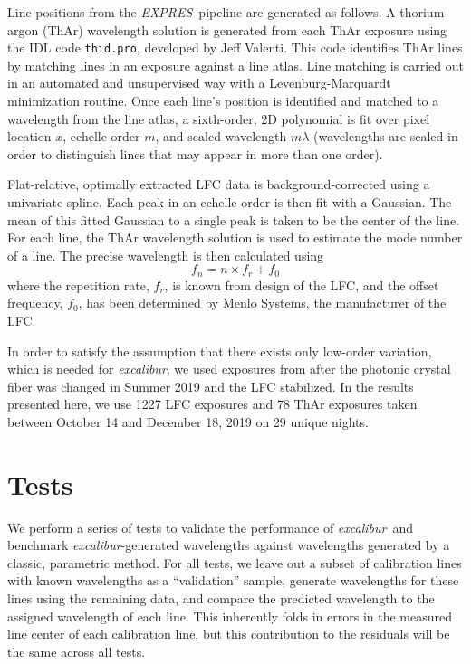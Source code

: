 \documentclass[modern]{aastex63}
\newcommand{\project}[1]{\textsl{#1}}
\newcommand{\name}{\project{excalibur}}
\newcommand{\acronym}[1]{{\small{#1}}}
\newcommand{\expres}{\project{\acronym{EXPRES}}}
\begin{document}
Line positions from the \expres\ pipeline are generated as follows.  A thorium argon (ThAr) wavelength solution is generated from each ThAr exposure using the IDL code \texttt{thid.pro}, developed by Jeff Valenti.  This code identifies ThAr lines by matching lines in an exposure against a line atlas.  Line matching is carried out in an automated and unsupervised way with a Levenburg-Marquardt minimization routine.  Once each line's position is identified and matched to a wavelength from the line atlas, a sixth-order, 2D polynomial is fit over pixel location $x$, echelle order $m$, and scaled wavelength $m\lambda$ (wavelengths are scaled in order to distinguish lines that may appear in more than one order).
 
 Flat-relative, optimally extracted LFC data is background-corrected using a univariate spline.  Each peak in an echelle order is then fit with a Gaussian.  The mean of this fitted Gaussian to a single peak is taken to be the center of the line.  For each line, the ThAr wavelength solution is used to estimate the mode number of a line.  The precise wavelength is then calculated using
 \begin{equation}
 f_n = n \times  f_r + f_0
 \label{eq:lfc}
 \end{equation}
 where the repetition rate, $f_r$, is known from design of the LFC, and the offset frequency, $f_0$, has been determined by Menlo Systems, the manufacturer of the LFC.
 
In order to satisfy the assumption that there exists only low-order variation, which is needed for \name, we used exposures from after the photonic crystal fiber was changed in Summer 2019 and the LFC stabilized.  In the results presented here, we use 1227 LFC exposures and 78 ThAr exposures taken between October 14 and December 18, 2019 on 29 unique nights.


\section{Tests}\label{sec:tests}
We perform a series of tests to validate the performance of \name\ and benchmark \name -generated wavelengths against wavelengths generated by a classic, parametric method.  For all tests, we leave out a subset of calibration lines with known wavelengths as a ``validation'' sample, generate wavelengths for these lines using the remaining data, and compare the predicted wavelength to the assigned wavelength of each line.  This inherently folds in errors in the measured line center of each calibration line, but this contribution to the residuals will be the same across all tests.
\end{document}
